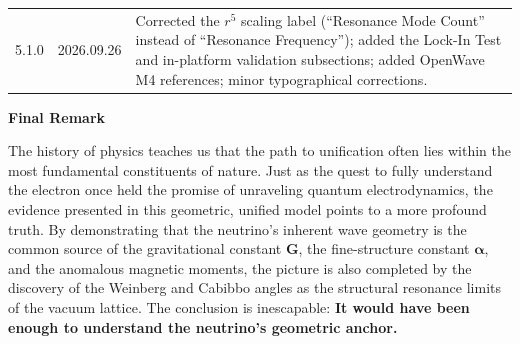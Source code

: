 \documentclass[10pt,a4paper]{article}
\begin{document}
\begin{longtable}{@{}p{1.6cm}p{1.8cm}p{10.1cm}@{}}
	5.1.0 & 2026.09.26 &
	Corrected the $r^5$ scaling label (``Resonance Mode Count'' instead
	of ``Resonance Frequency''); added the Lock-In Test and in-platform
	validation subsections; added OpenWave M4 references; minor
	typographical corrections. \\
\end{longtable}

\clearpage

\vspace{0.5cm}
\begin{flushleft}
	\textbf{Final Remark}
\end{flushleft}
The history of physics teaches us that the path to unification often lies within the most fundamental constituents of nature. Just as the quest to fully understand the electron once held the promise of unraveling quantum electrodynamics, the evidence presented in this geometric, unified model points to a more profound truth. By demonstrating that the neutrino's inherent wave geometry is the common source of the gravitational constant $\mathbf{G}$, the fine-structure constant $\mathbf{\alpha}$, and the anomalous magnetic moments, the picture is also completed by the discovery of the Weinberg and Cabibbo angles as the structural resonance limits of the vacuum lattice. The conclusion is inescapable: \textbf{It would have been enough to understand the neutrino's geometric anchor.}
\nolinenumbers
\end{document}
